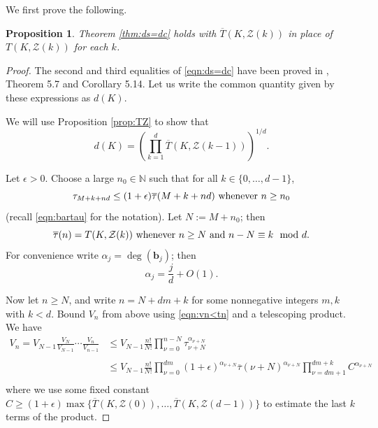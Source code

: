 \documentclass[12pt]{article}
\numberwithin{equation}{section}
\newtheorem{proposition}[theorem]{Proposition}
\newcommand{\N}{\mathbb{N}}
\newcommand{\stau}{\overline\tau}
\newcommand{\calZ}{\mathcal{Z}}
\newcommand{\bb}{\mathbf{b}}
\begin{document}
We first prove the following.

\begin{proposition} \label{414}
Theorem \ref{thm:ds=dc} holds with $\overline T(K,\calZ(k))$ in place of $T(K,\calZ(k))$ for each $k$.  
\end{proposition}


\begin{proof}
The second and third equalities of \eqref{eqn:ds=dc} have been proved in \cite{M}, Theorem 5.7 and Corollary 5.14.  Let us write the common quantity given by these expressions as $d(K)$.  

We will use Proposition \ref{prop:TZ} to show that  
\begin{equation}\label{eqn:sT=d} 
d(K) = \left(\prod_{k=1}^d \overline T(K,\calZ(k-1))\right)^{1/d}. \end{equation}

Let $\epsilon>0$.  Choose a large $n_0\in\N$ such that for all $k\in\{0,\ldots,d-1\}$,  
$$\tau_{M+k+nd}\leq (1+\epsilon)\stau(M+k+nd)  \hbox{  whenever }  n\geq n_0$$ (recall  \eqref{eqn:bartau} for the notation).  Let $N:=M+n_0$; then  
$$\stau(n)=T(K,\calZ(k)) \hbox{ whenever }n\geq N \hbox{ and }   n-N\equiv k \mod d.$$ 
For convenience  write $\alpha_j=\deg(\bb_j)$; then 
\begin{equation}\label{eqn:alpha_j} \alpha_j= \frac{j}{d} +O(1).  \end{equation}

Now let  $n\geq N$, and write $n=N+dm+k$ for some nonnegative integers $m,k$ with $k<d$.  Bound $V_{n}$ from above using \eqref{eqn:vn<tn} and a telescoping product.   We have 
\begin{equation}\label{eqn:tp} \begin{aligned}
V_n=V_{N-1}\frac{V_{N}}{V_{N-1}}\cdots\frac{V_n}{V_{n-1}}&\leq V_{N-1} \frac{n!}{N!} \prod_{\nu=0}^{n-N}  \tau_{\nu+N}^{\alpha_{\nu+N}} \\ 
&   \\
&\leq V_{N-1} \frac{n!}{N!} \prod_{\nu=0}^{dm} (1+\epsilon)^{\alpha_{\nu+N}}\stau(\nu+N)^{\alpha_{\nu+N}} 
 \prod_{\nu=dm+1}^{dm+k} C^{\alpha_{\nu+N}} \\ 
\end{aligned}\end{equation}
where we use some fixed constant $C\geq(1+\epsilon)\max\{\overline T(K,\calZ(0)),\ldots,\overline T(K,\calZ(d-1))  \}$  to estimate the last $k$ terms of the product.



\end{proof}
\end{document}
